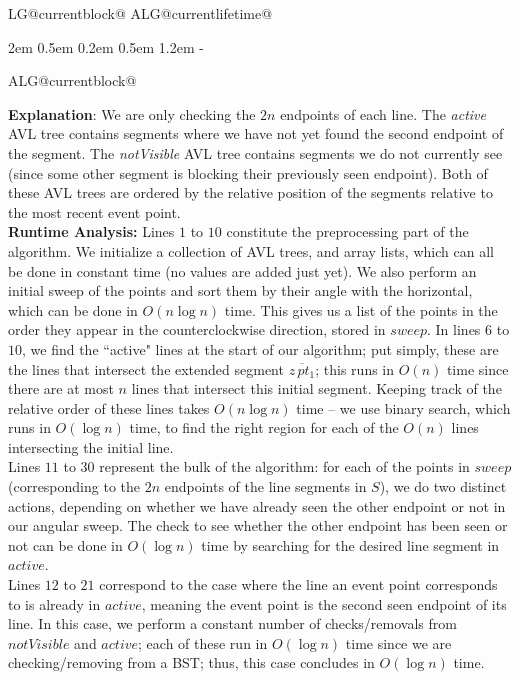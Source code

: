 \documentclass[11pt]{article}
\makeatletter
\newlength{\continueindent}
\renewenvironment{algorithmic}[1][0]%
   {%
   \edef\ALG@numberfreq{#1}%
   \def\@currentlabel{\theALG@line}%
   \setcounter{ALG@line}{0}%
   \setcounter{ALG@rem}{0}%
   \let\\\algbreak%
   \expandafter\edef\csname ALG@currentblock@\theALG@nested\endcsname{0}%
   \expandafter\let\csname ALG@currentlifetime@\theALG@nested\endcsname\relax%
   \begin{list}%
      {\ALG@step}%
      {%
      \rightmargin\z@%
      \itemsep\z@ \itemindent\z@ \listparindent2em%
      \partopsep\z@ \parskip\z@ \parsep\z@%
      \labelsep 0.5em \topsep 0.2em%
      \ifthenelse{\equal{#1}{0}}%
         {\labelwidth 0.5em}%
         {\labelwidth 1.2em}%
       \leftmargin\labelwidth \addtolength{\leftmargin}{\labelsep}
      \ALG@tlm\z@%
      }%
      \parshape 2 \leftmargin \linewidth \continueindent \dimexpr\linewidth-\continueindent\relax
   \setcounter{ALG@nested}{0}%
   \ALG@beginalgorithmic%
   }%
   {%
   \ALG@closeloops%
   \expandafter\ifnum\csname ALG@currentblock@\theALG@nested\endcsname=0\relax%
   \else%
      \PackageError{algorithmicx}{Some blocks are not closed!!!}{}%
   \fi%
   \ALG@endalgorithmic%
   \end{list}%
   }%
\makeatother
\begin{document}
\begin{enumerate}
\begin{minipage}[t]{0.9\textwidth}
\begin{algorithm}[H]
\begin{algorithmic}[1]
    \end{algorithmic}
    \end{algorithm}
    \end{minipage}

    \vspace{1cm}

    \textbf{Explanation}: We are only checking the $2n$ endpoints of each line. The \textit{active} AVL tree contains segments where we have not yet found the second endpoint of the segment. The \textit{notVisible} AVL tree contains segments we do not currently see (since some other segment is blocking their previously seen endpoint). Both of these AVL trees are ordered by the relative position of the segments relative to the most recent event point. \\
    
    \textbf{Runtime Analysis:}
    Lines $1$ to $10$ constitute the preprocessing part of the algorithm. We initialize a collection of AVL trees, and array lists, which can all be done in constant time (no values are added just yet). We also perform an initial sweep of the points and sort them by their angle with the horizontal, which can be done in $O(n\log n)$ time. This gives us a list of the points in the order they appear in the counterclockwise direction, stored in $sweep$. In lines $6$ to $10$, we find the ``active" lines at the start of our algorithm; put simply, these are the lines that intersect the extended segment $\overline{z \, pt_1}$; this runs in $O(n)$ time since there are at most $n$ lines that intersect this initial segment. Keeping track of the relative order of these lines takes $O(n \log n)$ time -- we use binary search, which runs in $O(\log n)$ time, to find the right region for each of the $O(n)$ lines intersecting the initial line. \\

    Lines $11$ to $30$ represent the bulk of the algorithm: for each of the points in $sweep$ (corresponding to the $2n$ endpoints of the line segments in $S$), we do two distinct actions, depending on whether we have already seen the other endpoint or not in our angular sweep. The check to see whether the other endpoint has been seen or not can be done in $O(\log n)$ time by searching for the desired line segment in $active$.\\

    Lines $12$ to $21$ correspond to the case where the line an event point corresponds to is already in $active$, meaning the event point is the second seen endpoint of its line. In this case, we perform a constant number of checks/removals from $notVisible$ and $active$; each of these run in $O(\log n)$ time since we are checking/removing from a BST; thus, this case concludes in $O(\log n)$ time. \\


\end{enumerate}
\end{document}
